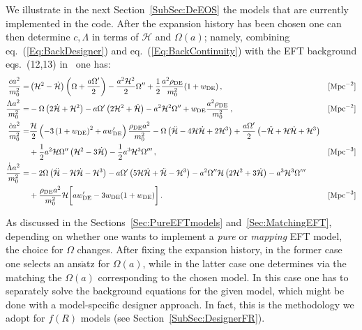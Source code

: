 \documentclass[prd,nofootinbib,showpacs]{revtex4}
\def\hub{{\mathcal H}}
\begin{document}
{We illustrate in the next Section~\ref{SubSec:DeEOS} the models that are currently  implemented in the code. After the expansion history has been chosen one can then determine $c,\Lambda$ in terms of $\hub$ and $\Omega(a)$; namely, combining  eq.~(\ref{Eq:BackDesigner}) and eq.~(\ref{Eq:BackContinuity}) with the EFT background eqs.~(12,13) in~\cite{Hu:2013twa} one has:
%
\begin{align}\label{Eq:DesignerCLambda}
\frac{c a^2}{m_0^2} =& \left(\mathcal{H}^2- \dot{\mathcal{H}}\right) \left(\Omega +\frac{a\Omega^\prime}{2} \right) -\frac{a^2\mathcal{H}^2}{2}\Omega^{\prime\prime} + \frac{1}{2}\frac{a^2 \rho_{\rm DE}}{m_0^2}(1+w_{\rm DE})\, , & &   [\text{Mpc}^{-2}] \\
%
 \frac{\Lambda a^2}{m_0^2} =& -\Omega\left(2\mathcal{\dot{H}} + \mathcal{H}^2\right) -a\Omega^\prime \left(2\mathcal{H}^2 + \dot{\mathcal{H}} \right) - a^2\mathcal{H}^2 \Omega^{\prime \prime} + w_{\rm DE}\frac{a^2\rho_{\rm DE}}{m_0^2}\, , & & [\text{Mpc}^{-2}]  \\
%
\frac{\dot{c} a^2}{m_0^2} =& \frac{\mathcal{H}}{2}\left(-3 \left(1+w_{\rm DE}\right)^2+ a w^\prime_{\rm DE} \right)\frac{\rho_{\rm DE} a^2}{m_0^2} -\Omega \left(\ddot{\mathcal{H}}-4 \mathcal{H} \dot{\mathcal{H}} + 2 \mathcal{H}^3 \right)  + \frac{a\Omega^\prime}{2} \left(-\ddot{\mathcal{H}} + \mathcal{H}\dot{\mathcal{H}} +\mathcal{H}^3  \right) \nonumber \\
 &  +\frac{1}{2}a^2 \mathcal{H} \Omega^{\prime \prime}\left(\mathcal{H}^2 -3 \dot{\mathcal{H}} \right) -\frac{1}{2} a^3 \mathcal{H}^3 \Omega^{\prime\prime\prime}\, , & & [\text{Mpc}^{-3}] \\
%
\frac{\dot{\Lambda} a^2}{m_0^2} =& -2\Omega\left(\ddot{\mathcal{H}}- \mathcal{H} \dot{\mathcal{H}} -\mathcal{H}^3 \right) -a\Omega^{\prime}\left(5\mathcal{H}\dot{\mathcal{H}}+\ddot{\mathcal{H}} -\mathcal{H}^3\right)  - a^2\Omega^{\prime\prime}\mathcal{H}\left(2\mathcal{H}^2+3\dot{\mathcal{H}}\right)-a^3\mathcal{H}^3\Omega^{\prime\prime\prime} \nonumber\\
        & + \frac{\rho_{\rm DE} a^2}{m_0^2} \mathcal{H}\bigg[a w^\prime_{\rm DE} -3 w_{\rm DE}(1+w_{\rm DE}) \bigg] \, .& & [\text{Mpc}^{-3}]
\end{align}

As discussed in the Sections~\ref{Sec:PureEFTmodels} and~\ref{Sec:MatchingEFT}, depending on whether one wants to implement a \emph{pure} or \emph{mapping} EFT model, the choice for $\Omega$ changes. After fixing the expansion history, in the former case one selects an ans$\ddot{\text{a}}$tz for $\Omega(a)$, while in the latter case one determines via the matching the $\Omega(a)$ corresponding to the chosen model. In this case one has to separately solve the background equations for the given model, which might be done with a model-specific designer approach. In fact, this is the methodology we adopt for $f(R)$ models (see Section~\ref{SubSec:DesignerFR}).

}
\end{document}
